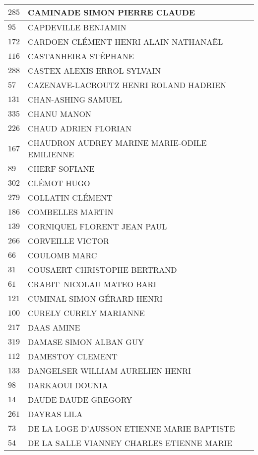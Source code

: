 \begin{xltabular}{\linewidth}{|l|X|}
    \hline
    $285$ & CAMINADE SIMON PIERRE CLAUDE \\
    \hline
    $95$ & CAPDEVILLE BENJAMIN \\
    \hline
    $172$ & CARDOEN CLÉMENT HENRI ALAIN NATHANAËL \\
    \hline
    $116$ & CASTANHEIRA STÉPHANE \\
    \hline
    $288$ & CASTEX ALEXIS ERROL SYLVAIN \\
    \hline
    $57$ & CAZENAVE-LACROUTZ HENRI ROLAND HADRIEN \\
    \hline
    $131$ & CHAN-ASHING SAMUEL \\
    \hline
    $335$ & CHANU MANON \\
    \hline
    $226$ & CHAUD ADRIEN FLORIAN \\
    \hline
    $167$ & CHAUDRON AUDREY MARINE MARIE-ODILE EMILIENNE \\
    \hline
    $89$ & CHERF SOFIANE \\
    \hline
    $302$ & CLÉMOT HUGO \\
    \hline
    $279$ & COLLATIN CLÉMENT \\
    \hline
    $186$ & COMBELLES MARTIN \\
    \hline
    $139$ & CORNIQUEL FLORENT JEAN PAUL \\
    \hline
    $266$ & CORVEILLE VICTOR \\
    \hline
    $66$ & COULOMB MARC \\
    \hline
    $31$ & COUSAERT CHRISTOPHE BERTRAND \\
    \hline
    $61$ & CRABIT--NICOLAU MATEO BARI \\
    \hline
    $121$ & CUMINAL SIMON GÉRARD HENRI \\
    \hline
    $100$ & CURELY CURELY MARIANNE \\
    \hline
    $217$ & DAAS AMINE \\
    \hline
    $319$ & DAMASE SIMON ALBAN GUY \\
    \hline
    $112$ & DAMESTOY CLEMENT \\
    \hline
    $133$ & DANGELSER WILLIAM AURELIEN HENRI \\
    \hline
    $98$ & DARKAOUI DOUNIA \\
    \hline
    $14$ & DAUDE DAUDE GREGORY \\
    \hline
    $261$ & DAYRAS LILA \\
    \hline
    $73$ & DE LA LOGE D'AUSSON ETIENNE MARIE BAPTISTE \\
    \hline
    $54$ & DE LA SALLE VIANNEY CHARLES ETIENNE MARIE \\

\end{xltabular}
